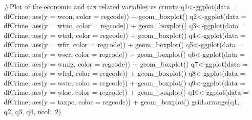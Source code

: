 \documentclass[]{article}
\newenvironment{Shaded}{}{}
\newcommand{\CommentTok}[1]{\textcolor[rgb]{0.00,0.50,0.00}{#1}}
\newcommand{\DataTypeTok}[1]{#1}
\newcommand{\DecValTok}[1]{#1}
\newcommand{\KeywordTok}[1]{\textcolor[rgb]{0.00,0.00,1.00}{#1}}
\newcommand{\NormalTok}[1]{#1}
\newcommand{\OperatorTok}[1]{#1}
\newcommand{\StringTok}[1]{\textcolor[rgb]{0.00,0.50,0.50}{#1}}
\begin{document}
\begin{Shaded}
\begin{Highlighting}[]
\CommentTok{#Plot of the economic and tax related variables vs crmrte}
\NormalTok{q1<-}\KeywordTok{ggplot}\NormalTok{(}\DataTypeTok{data =}\NormalTok{ dfCrime, }\KeywordTok{aes}\NormalTok{(}\DataTypeTok{y =}\NormalTok{ wcon, }\DataTypeTok{color =}\NormalTok{ regcode)) }\OperatorTok{+}
\StringTok{      }\KeywordTok{geom_boxplot}\NormalTok{()}
\NormalTok{q2<-}\KeywordTok{ggplot}\NormalTok{(}\DataTypeTok{data =}\NormalTok{ dfCrime, }\KeywordTok{aes}\NormalTok{(}\DataTypeTok{y =}\NormalTok{ wtuc, }\DataTypeTok{color =}\NormalTok{ regcode)) }\OperatorTok{+}
\StringTok{      }\KeywordTok{geom_boxplot}\NormalTok{()}
\NormalTok{q3<-}\KeywordTok{ggplot}\NormalTok{(}\DataTypeTok{data =}\NormalTok{ dfCrime, }\KeywordTok{aes}\NormalTok{(}\DataTypeTok{y =}\NormalTok{ wtrd, }\DataTypeTok{color =}\NormalTok{ regcode)) }\OperatorTok{+}
\StringTok{      }\KeywordTok{geom_boxplot}\NormalTok{()}
\NormalTok{q4<-}\KeywordTok{ggplot}\NormalTok{(}\DataTypeTok{data =}\NormalTok{ dfCrime, }\KeywordTok{aes}\NormalTok{(}\DataTypeTok{y =}\NormalTok{ wfir, }\DataTypeTok{color =}\NormalTok{ regcode)) }\OperatorTok{+}
\StringTok{      }\KeywordTok{geom_boxplot}\NormalTok{()}
\NormalTok{q5<-}\KeywordTok{ggplot}\NormalTok{(}\DataTypeTok{data =}\NormalTok{ dfCrime, }\KeywordTok{aes}\NormalTok{(}\DataTypeTok{y =}\NormalTok{ wser, }\DataTypeTok{color =}\NormalTok{ regcode)) }\OperatorTok{+}
\StringTok{      }\KeywordTok{geom_boxplot}\NormalTok{()}
\NormalTok{q6<-}\KeywordTok{ggplot}\NormalTok{(}\DataTypeTok{data =}\NormalTok{ dfCrime, }\KeywordTok{aes}\NormalTok{(}\DataTypeTok{y =}\NormalTok{ wmfg, }\DataTypeTok{color =}\NormalTok{ regcode)) }\OperatorTok{+}
\StringTok{      }\KeywordTok{geom_boxplot}\NormalTok{()}
\NormalTok{q7<-}\KeywordTok{ggplot}\NormalTok{(}\DataTypeTok{data =}\NormalTok{ dfCrime, }\KeywordTok{aes}\NormalTok{(}\DataTypeTok{y =}\NormalTok{ wfed, }\DataTypeTok{color =}\NormalTok{ regcode)) }\OperatorTok{+}
\StringTok{      }\KeywordTok{geom_boxplot}\NormalTok{()}
\NormalTok{q8<-}\KeywordTok{ggplot}\NormalTok{(}\DataTypeTok{data =}\NormalTok{ dfCrime, }\KeywordTok{aes}\NormalTok{(}\DataTypeTok{y =}\NormalTok{ wsta, }\DataTypeTok{color =}\NormalTok{ regcode)) }\OperatorTok{+}
\StringTok{      }\KeywordTok{geom_boxplot}\NormalTok{()}
\NormalTok{q9<-}\KeywordTok{ggplot}\NormalTok{(}\DataTypeTok{data =}\NormalTok{ dfCrime, }\KeywordTok{aes}\NormalTok{(}\DataTypeTok{y =}\NormalTok{ wloc, }\DataTypeTok{color =}\NormalTok{ regcode)) }\OperatorTok{+}
\StringTok{      }\KeywordTok{geom_boxplot}\NormalTok{()}
\NormalTok{q10<-}\KeywordTok{ggplot}\NormalTok{(}\DataTypeTok{data =}\NormalTok{ dfCrime, }\KeywordTok{aes}\NormalTok{(}\DataTypeTok{y =}\NormalTok{ taxpc, }\DataTypeTok{color =}\NormalTok{ regcode)) }\OperatorTok{+}
\StringTok{      }\KeywordTok{geom_boxplot}\NormalTok{()}
\KeywordTok{grid.arrange}\NormalTok{(q1, q2, q3, q4, }\DataTypeTok{ncol=}\DecValTok{2}\NormalTok{)}
\end{Highlighting}
\end{Shaded}
\end{document}

